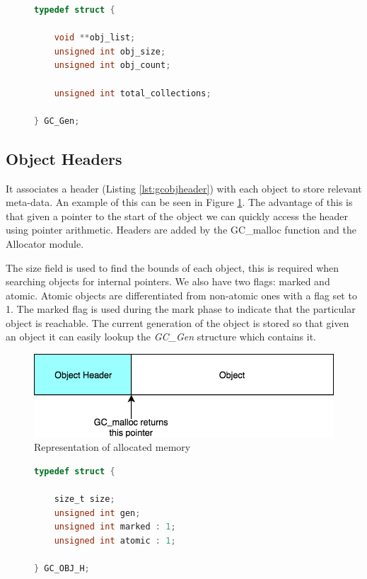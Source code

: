 \documentclass[../diss.tex]{subfiles}
\begin{document}
\begin{figure}
\begin{lstlisting}[language=C, caption=The GC\_Gen structure with comments removed, label={lst:gcgen}]
typedef struct {

    void **obj_list;
    unsigned int obj_size;
    unsigned int obj_count;

    unsigned int total_collections;

} GC_Gen;
\end{lstlisting}
\end{figure}

\subsection{Object Headers}

It associates a header (Listing \ref{lst:gcobjheader}) with each object to store relevant meta-data. An example of this can be seen in Figure \ref{fig:objectheaders}. The advantage of this is that given a pointer to the start of the object we can quickly access the header using pointer arithmetic. Headers are added by the GC\_malloc function and the Allocator module.

The size field is used to find the bounds of each object, this is required when searching objects for internal pointers. We also have two flags: marked and atomic. Atomic objects are differentiated from non-atomic ones with a flag set to 1. The marked flag is used during the mark phase to indicate that the particular object is reachable. The current generation of the object is stored so that given an object it can easily lookup the \emph{GC\_Gen} structure which contains it.

\begin{figure}
    \centering
    \includegraphics[max width=0.8\linewidth]{figs/objectheaders.png}
    \caption{Representation of allocated memory}
    \label{fig:objectheaders}
\end{figure}

\begin{figure}
\begin{lstlisting}[language=C, caption=The GC\_OBJ\_H structure with comments removed, label={lst:gcobjheader}]
typedef struct {

    size_t size;
    unsigned int gen;
    unsigned int marked : 1;
    unsigned int atomic : 1;

} GC_OBJ_H;
\end{lstlisting}
\end{figure}
\end{document}

